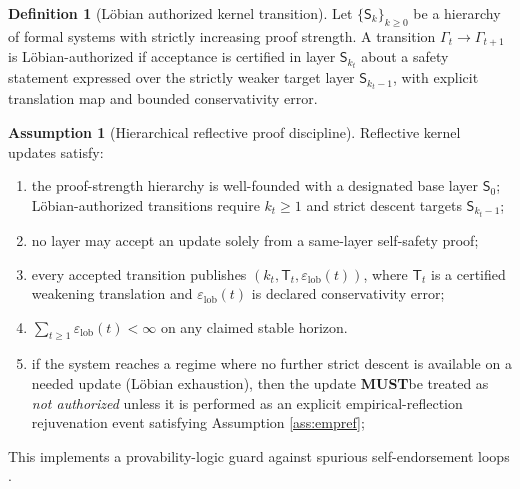 \documentclass[11pt,a4paper]{article}
\newcommand{\MUST}{\textbf{MUST}}
\newcommand{\eps}{\varepsilon}
\theoremstyle{definition}
\newtheorem{definition}{Definition}
\newtheorem{assumption}{Assumption}
\theoremstyle{remark}
\begin{document}
\begin{definition}[L\"obian authorized kernel transition]\label{def:l_obian_authorized_kernel_transition}
Let $\{\mathsf S_k\}_{k\ge 0}$ be a hierarchy of formal systems with strictly increasing proof strength.
A transition $\Gamma_t\to \Gamma_{t+1}$ is L\"obian-authorized if acceptance is certified in layer $\mathsf S_{k_t}$ about a safety statement expressed over the strictly weaker target layer $\mathsf S_{k_t-1}$, with explicit translation map and bounded conservativity error.
\end{definition}

\begin{assumption}[Hierarchical reflective proof discipline]\label{ass:lob}
Reflective kernel updates satisfy:
\begin{enumerate}
  \item the proof-strength hierarchy is well-founded with a designated base layer $\mathsf S_0$; L\"obian-authorized transitions require $k_t\ge 1$ and strict descent targets $\mathsf S_{k_t-1}$;
  \item no layer may accept an update solely from a same-layer self-safety proof;
  \item every accepted transition publishes $(k_t,\mathsf T_t,\eps_{\mathrm{lob}}(t))$, where $\mathsf T_t$ is a certified weakening translation and $\eps_{\mathrm{lob}}(t)$ is declared conservativity error;
  \item $\sum_{t\ge 1}\eps_{\mathrm{lob}}(t)<\infty$ on any claimed stable horizon.
  \item if the system reaches a regime where no further strict descent is available on a needed update (L\"obian exhaustion), then the update \MUST be treated as \emph{not authorized} unless it is performed as an explicit empirical-reflection rejuvenation event satisfying Assumption \ref{ass:empref};
\end{enumerate}
This implements a provability-logic guard against spurious self-endorsement loops \cite{Lob1955,Boolos1993,Solovay1976}.
\end{assumption}
\end{document}
